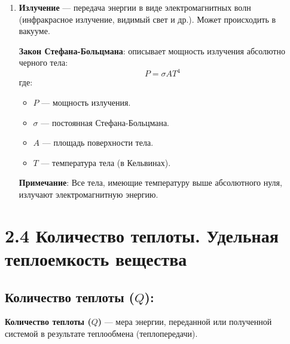 \documentclass[a4paper,12pt]{article}
\begin{document}
\begin{enumerate}[itemsep=0pt, topsep=0pt, parsep=3pt]
    \item \textbf{Излучение} --- передача энергии в виде электромагнитных волн (инфракрасное излучение, видимый свет и др.). Может происходить в вакууме.
    \par
    \textbf{Закон Стефана-Больцмана}: описывает мощность излучения абсолютно черного тела:
    \vspace{-0.05em}
    $$ P = \sigma A T^4 $$
    где:
    \begin{itemize}
        \item $P$ — мощность излучения.
        \item $\sigma$ — постоянная Стефана-Больцмана.
        \item $A$ — площадь поверхности тела.
        \item $T$ — температура тела (в Кельвинах).
    \end{itemize}
    \vspace{-0.05em}
    \textbf{Примечание}: Все тела, имеющие температуру выше абсолютного нуля, излучают электромагнитную энергию.
\end{enumerate}

\section*{2.4 Количество теплоты. Удельная теплоемкость вещества}
\vspace{-9pt}
\subsection*{Количество теплоты ($Q$):}
\vspace{-3pt}
\textbf{Количество теплоты ($Q$)} — мера энергии, переданной или полученной системой в результате теплообмена (теплопередачи).

\vspace{-9pt}
\end{document}
